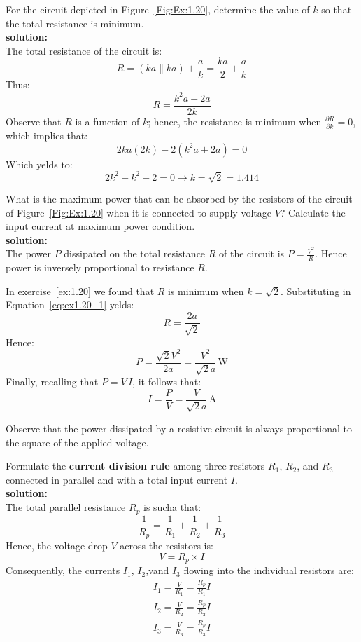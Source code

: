 \begin{exercise}\label{ex:1.20}
For the circuit depicted in Figure~\ref{Fig:Ex:1.20}, determine the value of $k$ so that the total resistance is minimum.\\

\textbf{solution:}\\
The total resistance of the circuit is:
\[R = (ka \parallel ka) + \frac{a}{k} =\frac{ka}{2} + \frac{a}{k}\]
Thus:
\begin{equation}
R = \frac{k^2a + 2a}{2k}\label{eq:ex1.20_1}
\end{equation}
Observe that $R$ is a function of $k$; hence, the resistance is minimum when $\frac{\partial R}{\partial k} = 0$, which implies that:
\[2ka(2k) - 2(k^2a + 2a) = 0\]
Which yelds to:
\[2k^2 - k^2 - 2 = 0 \longrightarrow k = \sqrt{2} = 1.414\]
\end{exercise}

\begin{exercise}
What is the maximum power that can be absorbed by the resistors of the circuit of Figure~\ref{Fig:Ex:1.20} when it is connected to supply voltage $V$? Calculate the input current at maximum power condition.\\

\textbf{solution:}\\
The power $P$ dissipated on the total resistance $R$ of the circuit is $P = \frac{V^2}{R}$. Hence power is inversely proportional to resistance $R$. 

In exercise~\ref{ex:1.20} we found that $R$ is minimum when $k=\sqrt{2}$. Substituting in Equation~\ref{eq:ex1.20_1} yelds: 
\[R = \frac{2a}{\sqrt{2}}\]
Hence:
\[P = \frac{\sqrt{2}V^2}{2a} = \frac{V^2}{\sqrt{2}a}\,\textrm{W}\]
Finally, recalling that $P=V\,I$, it follows that:
\[I = \frac{P}{V} = \frac{V}{\sqrt{2}a}\,\textrm{A}\]
\end{exercise}

\begin{remark}
Observe that the power dissipated by a resistive circuit is always proportional to the square of the applied voltage.
\end{remark}

\begin{exercise}
Formulate the \textbf{current division rule} among three resistors $R_1$, $R_2$, and $R_3$ connected in parallel and with a total input current $I$.\\

\textbf{solution:}\\
The total parallel resistance $R_p$ is sucha that:
\[\frac{1}{R_p} = \frac{1}{R_1} + \frac{1}{R_2} + \frac{1}{R_3}\]
Hence, the voltage drop $V$ across the resistors is:
\[V = R_p \times I \]
Consequently, the currents $I_1$, $I_2$,vand $I_3$ flowing into the individual resistors are:
\begin{gather*} 
I_1 = \frac{V}{R_1} = \frac{R_p}{R_1}I \\ 
I_2 = \frac{V}{R_2} = \frac{R_p}{R_2}I \\
I_3 = \frac{V}{R_3} = \frac{R_p}{R_3}I
\end{gather*}
\end{exercise}

